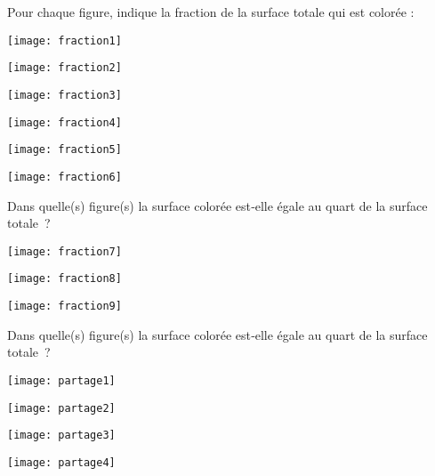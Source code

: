 

\begin{exercice}
Pour chaque figure, indique la fraction de la surface totale qui est colorée :
\begin{colenumerate}{3}
 \item 
 
 \texttt{[image: fraction1]}
 \item 
 
 \texttt{[image: fraction2]}
 \item 
 
 \texttt{[image: fraction3]}
 \item 
 
 \quad \texttt{[image: fraction4]}
 \item 
 
 \texttt{[image: fraction5]}
 \item 
 
 \texttt{[image: fraction6]}
 \end{colenumerate}
\end{exercice}


\begin{exercice}
Dans quelle(s) figure(s) la surface colorée est‑elle égale au quart de la surface totale ?
\begin{colenumerate}{3}
 \item 
 
 \texttt{[image: fraction7]}
  \item 
 
 \texttt{[image: fraction8]}
  \item 
 
 \texttt{[image: fraction9]}
 \end{colenumerate}
\end{exercice}


\begin{exercice}
Dans quelle(s) figure(s) la surface colorée est‑elle égale au quart de la surface totale ?
\begin{colenumerate}{2}
 \item 
 
 \texttt{[image: partage1]}
  \item 
 
 \texttt{[image: partage2]}
   \item 
 
 \texttt{[image: partage3]}
   \item 
 
 \texttt{[image: partage4]}
 \end{colenumerate}
\end{exercice}


